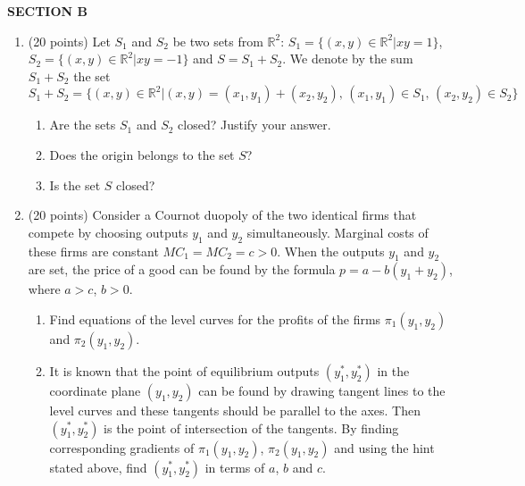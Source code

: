 \documentclass[12pt,a4paper]{article}
\def \RR{\mathbb{R}}
\begin{document}
\begin{enumerate}
 



\end{enumerate}

\textbf{SECTION B}

\begin{enumerate}[resume]


\item (20 points) Let $S_1$ and $S_2$ be two sets from $\RR^2$: $S_1=\{(x,y) \in \RR^2 | xy=1 \}$, $S_2=\{(x,y) \in \RR^2 | xy=-1 \}$ and $S=S_1+S_2$. We denote by the sum $S_1+S_2$ the set 
\[
S_1+S_2=\{ (x,y) \in \RR^2 | (x,y)=(x_1,y_1)+(x_2,y_2), \, (x_1,y_1) \in S_1, \, (x_2,y_2) \in S_2 \}
\]
\begin{enumerate}
\item Are the sets $S_1$ and $S_2$ closed? Justify your answer.
\item Does the origin belongs to the set $S$? %
\item Is the set $S$ closed? %
\end{enumerate}
\item (20 points) Consider a Cournot duopoly of the two identical firms that compete by choosing outputs $y_1$  and $y_2$  simultaneously. Marginal costs of these firms are constant $MC_1=MC_2=c>0$. When the outputs $y_1$  and $y_2$ are set, the price of a good can be found by the formula  $p=a-b(y_1+y_2)$, where  $a>c$, $b>0$.
\begin{enumerate}
\item Find equations of the level curves for the profits of the firms $\pi_1(y_1, y_2)$ and  $\pi_2(y_1, y_2)$.
\item It is known that the point of equilibrium outputs $(y_1^*, y_2^*)$  in the coordinate plane $(y_1, y_2)$ can be found by drawing tangent lines to the level curves and these tangents should be parallel to the axes. 
Then $(y_1^*, y_2^*)$ is the point of intersection of the tangents. 
By finding corresponding gradients of $\pi_1(y_1, y_2)$,  $\pi_2(y_1, y_2)$ and using the hint stated above, find    $(y_1^*, y_2^*)$ in terms of $a$, $b$ and $c$.
\end{enumerate}

\end{enumerate}
\end{document}
